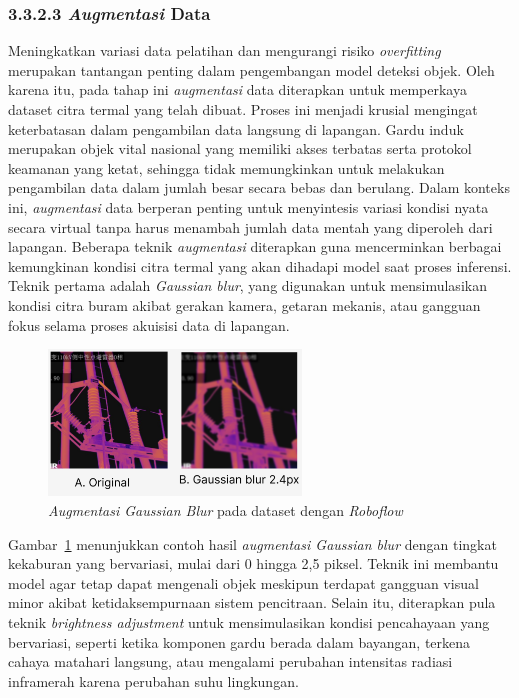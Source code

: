\subsubsection{3.3.2.3 \emph{Augmentasi} Data}
Meningkatkan variasi data pelatihan dan mengurangi risiko \emph{overfitting} merupakan tantangan penting dalam pengembangan model deteksi objek. Oleh karena itu, pada tahap ini \emph{augmentasi} data diterapkan untuk memperkaya dataset citra termal yang telah dibuat. Proses ini menjadi krusial mengingat keterbatasan dalam pengambilan data langsung di lapangan. Gardu induk merupakan objek vital nasional yang memiliki akses terbatas serta protokol keamanan yang ketat, sehingga tidak memungkinkan untuk melakukan pengambilan data dalam jumlah besar secara bebas dan berulang. Dalam konteks ini, \emph{augmentasi} data berperan penting untuk menyintesis variasi kondisi nyata secara virtual tanpa harus menambah jumlah data mentah yang diperoleh dari lapangan. Beberapa teknik \emph{augmentasi} diterapkan guna mencerminkan berbagai kemungkinan kondisi citra termal yang akan dihadapi model saat proses inferensi. Teknik pertama adalah \emph{Gaussian blur}, yang digunakan untuk mensimulasikan kondisi citra buram akibat gerakan kamera, getaran mekanis, atau gangguan fokus selama proses akuisisi data di lapangan.

\begin{figure}[H]
  \centering
  \includegraphics[width=0.6\textwidth]{gambar/bab3/aug-blur.png}
  \caption{\emph{Augmentasi Gaussian Blur} pada dataset dengan \emph{Roboflow}}
  \label{fig:dataset-blur}
\end{figure}

Gambar~\ref{fig:dataset-blur} menunjukkan contoh hasil \emph{augmentasi Gaussian blur} dengan tingkat kekaburan yang bervariasi, mulai dari 0 hingga 2{,}5 piksel. Teknik ini membantu model agar tetap dapat mengenali objek meskipun terdapat gangguan visual minor akibat ketidaksempurnaan sistem pencitraan. Selain itu, diterapkan pula teknik \emph{brightness adjustment} untuk mensimulasikan kondisi pencahayaan yang bervariasi, seperti ketika komponen gardu berada dalam bayangan, terkena cahaya matahari langsung, atau mengalami perubahan intensitas radiasi inframerah karena perubahan suhu lingkungan.

